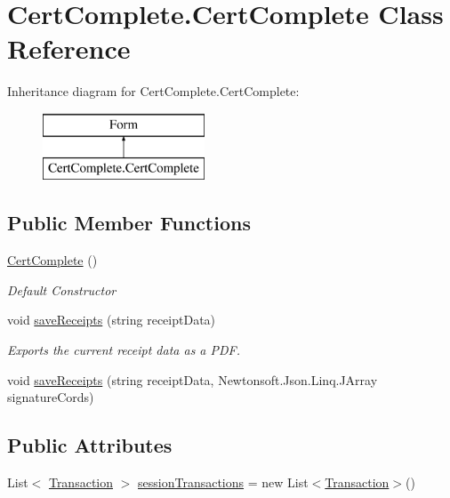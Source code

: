 \hypertarget{class_cert_complete_1_1_cert_complete}{}\section{Cert\+Complete.\+Cert\+Complete Class Reference}
\label{class_cert_complete_1_1_cert_complete}
Inheritance diagram for Cert\+Complete.\+Cert\+Complete\+:\begin{figure}[H]
\begin{center}
\leavevmode
\includegraphics[height=2.000000cm]{class_cert_complete_1_1_cert_complete}
\end{center}
\end{figure}
\subsection*{Public Member Functions}
\begin{DoxyCompactItemize}
\item 
\mbox{\hyperlink{class_cert_complete_1_1_cert_complete_aca2e4b4895fb938a23b6e056971e2a78}{Cert\+Complete}} ()
\begin{DoxyCompactList}\small\item\em Default Constructor \end{DoxyCompactList}\item 
void \mbox{\hyperlink{class_cert_complete_1_1_cert_complete_a99edec1e7fba6c4e77fdbff75eb449d1}{save\+Receipts}} (string receipt\+Data)
\begin{DoxyCompactList}\small\item\em Exports the current receipt data as a P\+DF. \end{DoxyCompactList}\item 
void \mbox{\hyperlink{class_cert_complete_1_1_cert_complete_a94ff8515ddfaf33d6f77ed9aa4ec497b}{save\+Receipts}} (string receipt\+Data, Newtonsoft.\+Json.\+Linq.\+J\+Array signature\+Cords)
\end{DoxyCompactItemize}
\subsection*{Public Attributes}
\begin{DoxyCompactItemize}
\item 
List$<$ \mbox{\hyperlink{class_cert_complete_1_1_transaction}{Transaction}} $>$ \mbox{\hyperlink{class_cert_complete_1_1_cert_complete_aabe5ae4beadab7c6de98de3b47baf498}{session\+Transactions}} = new List$<$\mbox{\hyperlink{class_cert_complete_1_1_transaction}{Transaction}}$>$()
\end{DoxyCompactItemize}
